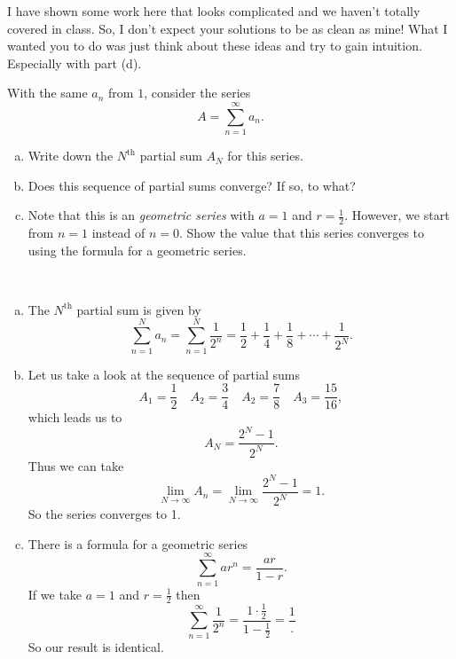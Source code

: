 \documentclass[12pt]{article} %
\begin{document}
\begin{remark}
I have shown some work here that looks complicated and we haven't totally covered in class.  So, I don't expect your solutions to be as clean as mine! What I wanted you to do was just think about these ideas and try to gain intuition. Especially with part (d).
\end{remark}

\newpage
\begin{problem}
With the same $a_n$ from $1$, consider the series
\[
A = \sum_{n=1}^\infty a_n.
\]
\begin{enumerate}[(a)]
    \item Write down the $N^\textrm{th}$ partial sum $A_N$ for this series.  
    \item Does this sequence of partial sums converge? If so, to what?
    \item Note that this is an \emph{geometric series} with $a=1$ and $r=\frac{1}{2}$. However, we start from $n=1$ instead of $n=0$. Show the value that this series converges to using the formula for a geometric series.
\end{enumerate}
\end{problem}
\begin{solution}~
\begin{enumerate}[(a)]
    \item The $N^\textrm{th}$ partial sum is given by
    \[
    \sum_{n=1}^N a_n = \sum_{n=1}^N \frac{1}{2^n} = \frac{1}{2}+\frac{1}{4}+\frac{1}{8}+\cdots + \frac{1}{2^N}.
    \]
    \item Let us take a look at the sequence of partial sums
    \[
    A_1 = \frac{1}{2} \quad A_2 = \frac{3}{4} \quad A_2 = \frac{7}{8} \quad A_3 = \frac{15}{16},
    \]
    which leads us to
    \[
    A_N = \frac{2^N -1}{2^N}.
    \]
    Thus we can take
    \[
    \lim_{N\to \infty }A_n =\lim_{N\to \infty} \frac{2^N-1}{2^N} = 1.
    \]
    So the series converges to 1.
    \item There is a formula for a geometric series 
    \[
    \sum_{n=1}^\infty ar^n = \frac{ar}{1-r}.
    \]
    If we take $a=1$ and $r=\frac{1}{2}$ then
    \[
    \sum_{n=1}^\infty \frac{1}{2^n} = \frac{1\cdot \frac{1}{2}}{1-\frac{1}{2}}=\frac{1}.
    \]
    So our result is identical.
\end{enumerate}
\end{solution}
\end{document}
